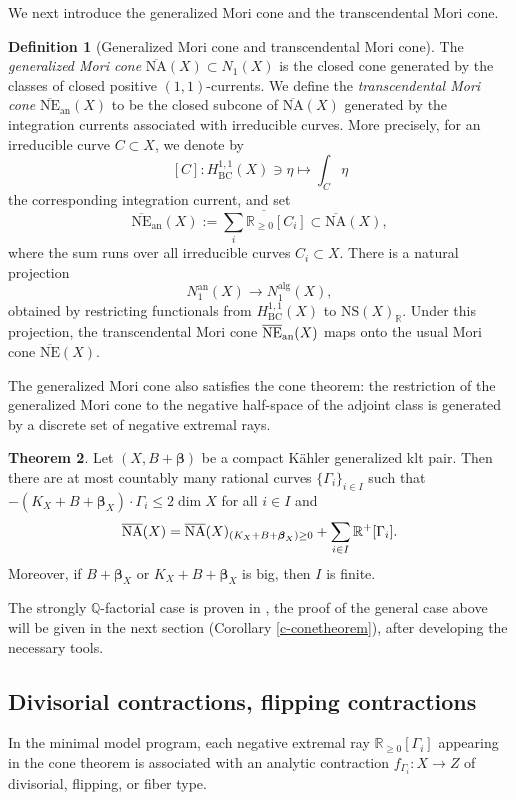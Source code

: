 \documentclass[11pt]{amsart}
\numberwithin{equation}{section}
\def\bbeta{\boldsymbol{\beta}}
\def\dim{\operatorname{dim}}
\newcommand\Q{{\mathbb{Q}}}
\theoremstyle{definition}
\theoremstyle{definition}
\newtheorem{theorem}{Theorem}[section]
\theoremstyle{definition}
\newtheorem{definition}[theorem]{Definition}
\begin{document}
We next introduce the generalized Mori cone and the transcendental Mori cone. 
\begin{definition}[Generalized Mori cone and transcendental Mori cone]
The \textit{generalized Mori cone} $\overline{\mathrm{NA}}(X) \subset N_1(X)$ 
is the closed cone generated by the classes of closed positive $(1,1)$-currents. We define the \textit{transcendental Mori cone} $\overline{\mathrm{NE}}_{\mathrm{an}}(X)$ to be the closed subcone of $\overline{\mathrm{NA}}(X)$ generated by the integration currents associated with irreducible curves. More precisely, for an irreducible curve $C \subset X$, we denote by
$$
[C]: H^{1,1}_{\mathrm{BC}}(X)\ni \eta \longmapsto \int_C \eta
$$
the corresponding integration current, and set
$$
\overline{\mathrm{NE}}_{\mathrm{an}}(X)
:=\overline{\sum_i \mathbb{R}_{\geq 0}[C_i]}
\subset \overline{\mathrm{NA}}(X),
$$
where the sum runs over all irreducible curves $C_i \subset X$. There is a natural projection
$$
N_1^{\mathrm{an}}(X) \longrightarrow N_1^{\mathrm{alg}}(X),
$$
obtained by restricting functionals from $H^{1,1}_{\mathrm{BC}}(X)$ to $\mathrm{NS}(X)_{\mathbb{R}}$. Under this projection, the transcendental Mori cone $\overline{\text{NE}}_{\rm{an}}(X)$ maps onto the usual Mori cone $\overline{\text{NE}}(X)$.
\end{definition}


The generalized Mori cone also satisfies the cone theorem: the restriction of the generalized Mori cone to the negative half-space of the adjoint class is generated by a discrete set of negative extremal rays.
\begin{theorem}
Let $(X,B+\bbeta )$ be a  compact K\"ahler generalized klt pair. Then there are at most countably many rational curves $\{\Gamma _i\}_{i\in I}$ such that $-(K_X+B+\bbeta _X)\cdot \Gamma _i\leq 2\dim X$ for all $i\in I$ and  \[\overline{\rm NA}(X)=\overline{\rm NA}(X)_{(K_X+B+\bbeta _X) \geq 0}+\sum _{i\in I}\mathbb R ^+[\Gamma _i].\]
Moreover, if $B+\bbeta _X$ or $K_X+B+\bbeta _X$ is big, then $I$ is finite.
\end{theorem}
The strongly $\Q$-factorial case is proven in \cite{HP24}, the proof of the general case above will be given in the next section (Corollary \ref{c-conetheorem}), after developing the necessary tools.

\subsection{Divisorial contractions, flipping contractions}
In the minimal model program, each negative extremal ray $\mathbb{R}_{\geq 0}[\Gamma_i]$ appearing in the cone theorem is associated with an analytic contraction $f_{\Gamma_i}: X\to Z$ of divisorial, flipping, or fiber type.
\end{document}
